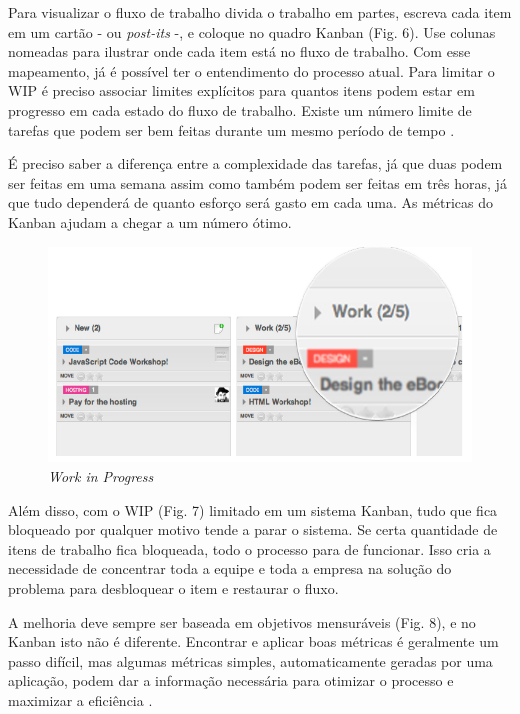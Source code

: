 Para visualizar o fluxo de trabalho divida o trabalho em partes, escreva cada item em um cartão - ou \textit{post-its} -, e coloque no quadro Kanban (Fig. 6). Use colunas nomeadas para ilustrar onde cada item está no fluxo de trabalho. Com esse mapeamento, já é possível ter o entendimento do processo atual. 
Para limitar o WIP é preciso associar limites explícitos para quantos itens podem estar em progresso em cada estado do fluxo de trabalho. Existe um número limite de tarefas que podem ser bem feitas durante um mesmo período de tempo \cite{klipp}. 

É preciso saber a diferença entre a complexidade das tarefas, já que duas podem ser feitas em uma semana assim como também podem ser feitas em três horas, já que tudo dependerá de quanto esforço será gasto em cada uma. As métricas do Kanban ajudam a chegar a um número ótimo.

\begin{figure}[H]
		\centering
		\label{fig05}
			\includegraphics[scale=0.5]{figuras/WIP.png}
		\caption{\textit{Work in Progress}  \cite{klipp}}
\end{figure}


Além disso, com o WIP (Fig. 7) limitado em um sistema Kanban, tudo que fica bloqueado por qualquer motivo tende a parar o sistema. Se certa quantidade de itens de trabalho fica bloqueada, todo o processo para de funcionar. Isso cria a necessidade de concentrar toda a equipe e toda a empresa na solução do problema para desbloquear o item e restaurar o fluxo. 

A melhoria deve sempre ser baseada em objetivos mensuráveis (Fig. 8), e no Kanban isto não é diferente. Encontrar e aplicar boas métricas é geralmente um passo difícil, mas algumas métricas simples, automaticamente geradas por uma aplicação, podem dar a informação necessária para otimizar o processo e maximizar a eficiência \cite{klipp}. 

